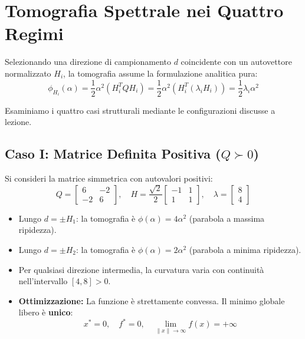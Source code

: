 \FloatBarrier
\section{Tomografia Spettrale nei Quattro Regimi}
\label{sec:opt-tomografia-quattro-regimi}

Selezionando una direzione di campionamento $d$ coincidente con un autovettore normalizzato $H_i$, la tomografia assume la formulazione analitica pura:
\begin{equation}
\phi_{H_i}(\alpha) = \frac{1}{2} \alpha^2 (H_i^T Q H_i) = \frac{1}{2} \alpha^2 (H_i^T (\lambda_i H_i)) = \frac{1}{2} \lambda_i \alpha^2
\end{equation}

Esaminiamo i quattro casi strutturali mediante le configurazioni discusse a lezione.

\subsection{Caso I: Matrice Definita Positiva (\texorpdfstring{$Q \succ 0$}{Q > 0})}
Si consideri la matrice simmetrica con autovalori positivi:
\begin{equation}
Q = \begin{bmatrix} 6 & -2 \\ -2 & 6 \end{bmatrix}, \quad H = \frac{\sqrt{2}}{2} \begin{bmatrix} -1 & 1 \\ 1 & 1 \end{bmatrix}, \quad \lambda = \begin{bmatrix} 8 \\ 4 \end{bmatrix}
\end{equation}
\begin{itemize}
    \item Lungo $d = \pm H_1$: la tomografia \`e $\phi(\alpha) = 4\alpha^2$ (parabola a massima ripidezza).
    \item Lungo $d = \pm H_2$: la tomografia \`e $\phi(\alpha) = 2\alpha^2$ (parabola a minima ripidezza).
    \item Per qualsiasi direzione intermedia, la curvatura varia con continuit\`a nell'intervallo $[4, 8] > 0$.
    \item \textbf{Ottimizzazione:} La funzione \`e strettamente convessa. Il minimo globale libero \`e \textbf{unico}:
    \begin{equation}
    x^* = 0, \quad f^* = 0, \quad \lim_{\|x\| \to \infty} f(x) = +\infty
    \end{equation}
\end{itemize}

